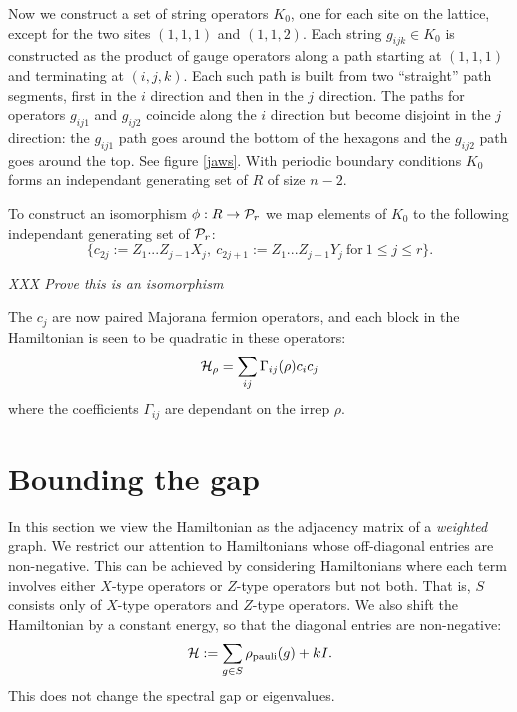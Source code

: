 \documentclass[12pt,notitlepage,longbibliography,nofootinbib,tightenlines]{revtex4}
\begin{document}
Now we construct a set of string operators $K_0$,
one for each site on the lattice, except for
the two sites $(1,1,1)$ and $(1,1,2).$
Each string $g_{ijk}\in K_0$
is constructed as the product of
gauge operators along a path starting at
$(1,1,1)$ and terminating at $(i,j,k).$
Each such path is built from two ``straight''
path segments, first in the $i$ direction
and then in the $j$ direction. 
The paths for operators $g_{ij1}$ and
$g_{ij2}$ coincide along the $i$ direction
but become disjoint in the $j$ direction:
the $g_{ij1}$ path goes around the bottom
of the hexagons and the $g_{ij2}$ path
goes around the top.
See figure \ref{jaws}.
With periodic boundary conditions $K_0$ forms an
independant generating set of $R$ of size $n-2.$

To construct an isomorphism $\phi: R\to \mathcal{P}_r$
we map elements of $K_0$ to the following independant generating
set of $\mathcal{P}_r$:
$$
\big\{c_{2j}:=Z_1...Z_{j-1} X_j,\ c_{2j+1}:=Z_1...Z_{j-1} Y_j\ \mbox{for}\ 1\le j\le r\big\}.
$$

{\it XXX Prove this is an isomorphism }

The $c_j$ are now paired Majorana fermion operators, 
and each block in the Hamiltonian
is seen to be quadratic in these operators:
$$
    \mathcal{H}_\rho = \sum_{ij} \Gamma_{ij}(\rho) c_i c_j
$$
where the coefficients $\Gamma_{ij}$
are dependant on the irrep $\rho.$


\section{Bounding the gap}

In this section we view the Hamiltonian as the adjacency matrix of
a {\it weighted} graph.
We restrict our attention to Hamiltonians whose off-diagonal entries
are non-negative.
This can be achieved by considering Hamiltonians where each term
involves either $X$-type operators or $Z$-type operators but not both.
That is, $S$ consists only of $X$-type operators and $Z$-type operators.
We also shift the Hamiltonian by a constant energy, so that
the diagonal entries are non-negative:
$$
\mathcal{H} := \sum_{g\in S} \rho_{\mathrm{pauli}}(g) + kI.
$$
This does not change
the spectral gap or eigenvalues.
\end{document}

